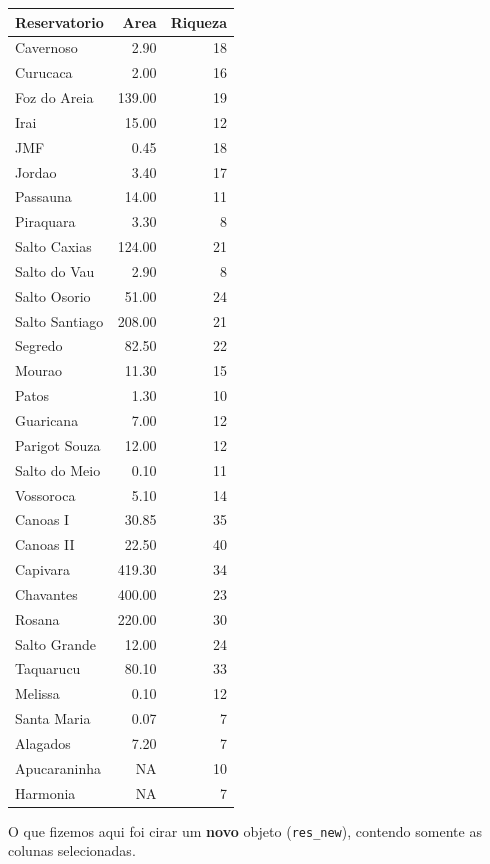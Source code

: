 \documentclass[
]{book}
\begin{document}
\begin{table}
\centering\begingroup\fontsize{12}{14}\selectfont

\begin{tabular}{lrr}
\toprule
Reservatorio & Area & Riqueza\\
\midrule
Cavernoso & 2.90 & 18\\
Curucaca & 2.00 & 16\\
Foz do Areia & 139.00 & 19\\
Irai & 15.00 & 12\\
JMF & 0.45 & 18\\
\addlinespace
Jordao & 3.40 & 17\\
Passauna & 14.00 & 11\\
Piraquara & 3.30 & 8\\
Salto Caxias & 124.00 & 21\\
Salto do Vau & 2.90 & 8\\
\addlinespace
Salto Osorio & 51.00 & 24\\
Salto Santiago & 208.00 & 21\\
Segredo & 82.50 & 22\\
Mourao & 11.30 & 15\\
Patos & 1.30 & 10\\
\addlinespace
Guaricana & 7.00 & 12\\
Parigot Souza & 12.00 & 12\\
Salto do Meio & 0.10 & 11\\
Vossoroca & 5.10 & 14\\
Canoas I & 30.85 & 35\\
\addlinespace
Canoas II & 22.50 & 40\\
Capivara & 419.30 & 34\\
Chavantes & 400.00 & 23\\
Rosana & 220.00 & 30\\
Salto Grande & 12.00 & 24\\
\addlinespace
Taquarucu & 80.10 & 33\\
Melissa & 0.10 & 12\\
Santa Maria & 0.07 & 7\\
Alagados & 7.20 & 7\\
Apucaraninha & NA & 10\\
\addlinespace
Harmonia & NA & 7\\
\bottomrule
\end{tabular}
\endgroup{}
\end{table}

O que fizemos aqui foi cirar um \textbf{novo} objeto (\texttt{res\_new}), contendo somente as colunas selecionadas.
\end{document}
